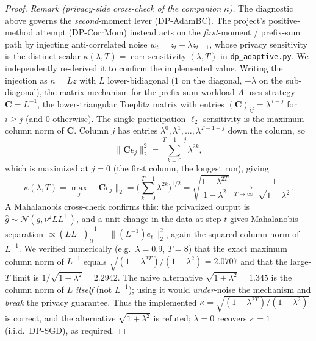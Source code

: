 \begin{proof}
\medskip
\noindent\emph{Remark (privacy-side cross-check of the companion $\kappa$).} The diagnostic above governs the \emph{second}-moment lever (DP-AdamBC). The project's positive-method attempt (DP-CorrMom) instead acts on the \emph{first}-moment / prefix-sum path by injecting anti-correlated noise $w_t=z_t-\lambda z_{t-1}$, whose privacy sensitivity is the distinct scalar $\kappa(\lambda,T)=\operatorname{corr\_sensitivity}(\lambda,T)$ in \texttt{dp\_adaptive.py}. We independently re-derived it to confirm the implemented value. Writing the injection as $n=Lz$ with $L$ lower-bidiagonal ($1$ on the diagonal, $-\lambda$ on the sub-diagonal), the matrix mechanism for the prefix-sum workload $A$ uses strategy $\mathbf C=L^{-1}$, the lower-triangular Toeplitz matrix with entries $(\mathbf C)_{ij}=\lambda^{\,i-j}$ for $i\ge j$ (and $0$ otherwise). The single-participation $\ell_2$ sensitivity is the maximum column norm of $\mathbf C$. Column $j$ has entries $\lambda^{0},\lambda^{1},\dots,\lambda^{T-1-j}$ down the column, so
\[
\|\mathbf C e_j\|_2^2=\sum_{k=0}^{T-1-j}\lambda^{2k},
\]
which is maximized at $j=0$ (the first column, the longest run), giving
\[
\kappa(\lambda,T)=\max_j\|\mathbf C e_j\|_2=\Big(\sum_{k=0}^{T-1}\lambda^{2k}\Big)^{1/2}=\sqrt{\frac{1-\lambda^{2T}}{1-\lambda^{2}}}\;\xrightarrow[T\to\infty]{}\;\frac{1}{\sqrt{1-\lambda^{2}}}.
\]
A Mahalanobis cross-check confirms this: the privatized output is $\hat g\sim\mathcal N(g,\nu^2 LL^{\!\top})$, and a unit change in the data at step $t$ gives Mahalanobis separation $\propto (LL^{\!\top})^{-1}_{tt}=\|(L^{-1})e_t\|_2^2$, again the squared column norm of $L^{-1}$. We verified numerically (e.g.\ $\lambda=0.9$, $T=8$) that the exact maximum column norm of $L^{-1}$ equals $\sqrt{(1-\lambda^{2T})/(1-\lambda^{2})}=2.0707$ and that the large-$T$ limit is $1/\sqrt{1-\lambda^2}=2.2942$. The naive alternative $\sqrt{1+\lambda^2}=1.345$ is the column norm of $L$ \emph{itself} (not $L^{-1}$); using it would \emph{under}-noise the mechanism and \emph{break} the privacy guarantee. Thus the implemented $\kappa=\sqrt{(1-\lambda^{2T})/(1-\lambda^2)}$ is correct, and the alternative $\sqrt{1+\lambda^2}$ is refuted; $\lambda=0$ recovers $\kappa=1$ (i.i.d.\ DP-SGD), as required.
\end{proof}
